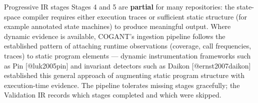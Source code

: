 \documentclass[
  ignorenonframetext,
]{beamer}
\begin{document}
\begin{frame}{Progressive IR stages}
Stages 4 and 5 are \textbf{partial} for many repositories: the
state-space compiler requires either execution traces or sufficient
static structure (for example annotated state machines) to produce
meaningful output. Where dynamic evidence is available, COGANT's
ingestion pipeline follows the established pattern of attaching runtime
observations (coverage, call frequencies, traces) to static program
elements --- dynamic instrumentation frameworks such as Pin
{[}@luk2005pin{]} and invariant detectors such as Daikon
{[}@ernst2007daikon{]} established this general approach of augmenting
static program structure with execution-time evidence. The pipeline
tolerates missing stages gracefully; the Validation IR records which
stages completed and which were skipped.
\end{frame}
\end{document}
